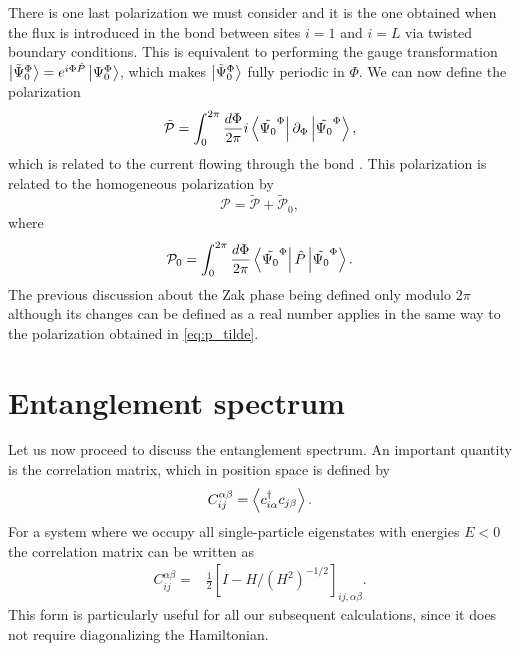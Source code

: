\documentclass[twocolumn,amsmath,longbibliography,amssymb,superscriptaddress]{revtex4-1}
\begin{document}
There is one last polarization we must consider and it is the one obtained when the flux is introduced in the bond between sites $i=1$ and $i=L$ via twisted boundary conditions. This is equivalent to performing the gauge transformation $\ket{\tilde{\Psi}_0^\Phi}=e^{i\Phi \hat{P}}\ket{\Psi_0^\Phi}$, which makes $\ket{\tilde{\Psi}_0^\Phi}$ fully periodic in $\Phi$. We can now define the polarization
\begin{equation}
\tilde{\mathcal{P}} = \int_0^{2\pi}\frac{d\Phi}{2\pi} i\bra{\tilde{\Psi_0}^\Phi}\partial_\Phi \ket{\tilde{\Psi_0}^\Phi},
\label{eq:p_tilde}
\end{equation}
which is related to the current flowing through the bond \cite{Watanabe2018}. This polarization is related to the homogeneous polarization by 
\begin{equation}
\mathcal{P}= \tilde{\mathcal{P}}+\tilde{\mathcal{P}}_0,
\end{equation} 
where
\begin{equation}
\mathcal{P}_0= \int_0^{2\pi}\frac{d\Phi}{2\pi} \bra{\tilde{\Psi_0}^\Phi}\hat{P}\ket{\tilde{\Psi_0}^\Phi}.
\end{equation} 
The previous discussion about the Zak phase being defined only modulo $2\pi$ although its changes can be defined as a real number applies in the same way to the polarization obtained in \eqref{eq:p_tilde}.


\section{Entanglement spectrum}
\label{section:ES}
Let us now proceed to discuss the entanglement spectrum. 
An important quantity is the correlation matrix, which in position space is defined by
\begin{align}
C_{ij}^{\alpha \beta} = \expval{c_{i\alpha}^\dagger c_{j\beta}}.
\end{align}
For a system where we occupy all single-particle eigenstates with energies $E<0$ the correlation matrix can be written  as
\begin{align}\label{eq:corr_mat2}
C_{ij}^{\alpha \beta} =& \frac{1}{2}\left[I - H/ (H^2)^{-1/2} \right]_{ij, \alpha \beta}.
\end{align}
This form is particularly useful for all our subsequent calculations, since it does not require diagonalizing the Hamiltonian.
\end{document}
